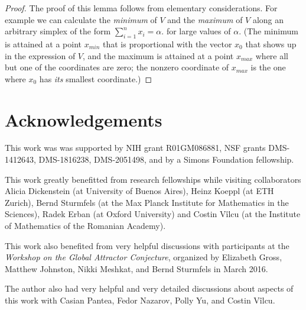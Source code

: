 \documentclass[12pt,letterpaper]{article}
\begin{document}
\begin{proof}
The proof of this lemma follows from elementary considerations. 
For example we can calculate the {\em minimum} of $V$ and the {\em maximum} of $V$ along an arbitrary simplex of the form 
$
\sum_{i=1}^n x_i = \alpha.
$
for large values of $\alpha$.
(The minimum is attained at a point $x_{min}$ that is proportional with the vector $x_0$ that shows up in the expression of $V$, and the maximum is attained at a point $x_{max}$ where all but one of the coordinates are zero; the nonzero coordinate of $x_{max}$ is the one where $x_0$ has {\em its} smallest coordinate.)
\end{proof}



















\newpage


\section*{Acknowledgements} This work was was supported by NIH grant R01GM086881, NSF grants DMS-1412643, DMS-1816238, DMS-2051498, and by a Simons Foundation fellowship. 

\noindent
This work greatly benefitted from research fellowships while visiting collaborators Alicia Dickenstein (at University of Buenos Aires), Heinz Koeppl (at ETH Zurich), Bernd Sturmfels (at the Max Planck Institute for Mathematics in the Sciences), Radek Erban (at Oxford University) and Costin V\^{i}lcu (at the Institute of Mathematics of the Romanian Academy).  

\noindent
This work also benefited from very helpful discussions with participants at the {\em Workshop on the Global Attractor Conjecture}, organized by Elizabeth Gross, Matthew Johnston, Nikki Meshkat, and Bernd Sturmfels in March 2016. 

\noindent
The author also had very helpful and very detailed discussions about aspects of this work with Casian Pantea, Fedor Nazarov, Polly Yu, and Costin V\^{i}lcu.
\end{document}
